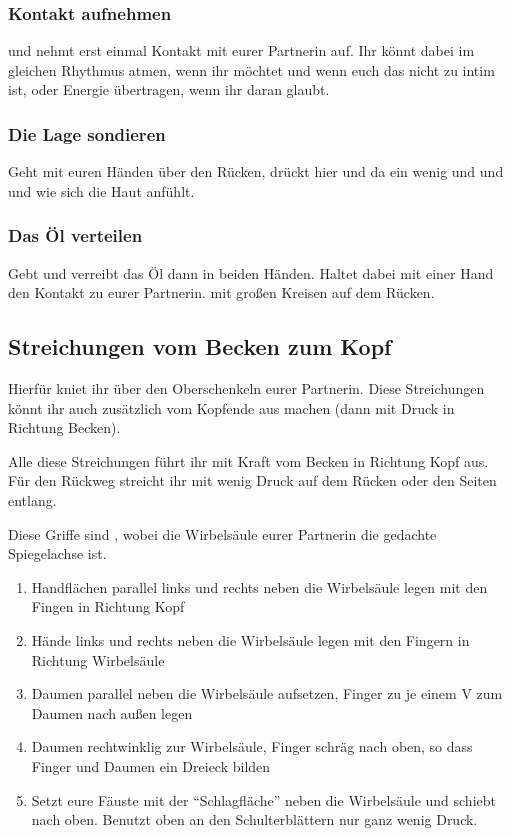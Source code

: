 \subsubsection{Kontakt aufnehmen}
 und nehmt erst einmal Kontakt mit eurer Partnerin auf. Ihr könnt dabei im gleichen Rhythmus atmen, wenn ihr möchtet und wenn euch das nicht zu intim ist, oder Energie übertragen, wenn ihr daran glaubt.

\subsubsection{Die Lage sondieren}
Geht mit euren Händen über den Rücken, drückt hier und da ein wenig und und  und wie sich die Haut anfühlt.

\subsubsection{Das Öl verteilen}

Gebt  und verreibt das Öl dann in beiden Händen. Haltet dabei mit einer Hand den Kontakt zu eurer Partnerin.  mit großen Kreisen auf dem Rücken.


\subsection{Streichungen vom Becken zum Kopf}
Hierfür kniet ihr über den Oberschenkeln eurer Partnerin. Diese Streichungen könnt ihr auch zusätzlich vom Kopfende aus machen (dann mit Druck in Richtung Becken).

Alle diese Streichungen führt ihr mit Kraft vom Becken in Richtung Kopf aus. Für den Rückweg streicht ihr mit wenig Druck auf dem Rücken oder den Seiten entlang.

Diese Griffe sind , wobei die Wirbelsäule eurer Partnerin die gedachte Spiegelachse ist.

\begin{enumerate}
	\item {} Handflächen parallel links und rechts neben die Wirbelsäule legen mit den Fingen in Richtung Kopf
	\item {} Hände links und rechts neben die Wirbelsäule legen mit den Fingern in Richtung Wirbelsäule
	\item {} Daumen parallel neben die Wirbelsäule aufsetzen, Finger zu je einem V zum Daumen nach außen legen
	\item {} Daumen rechtwinklig zur Wirbelsäule, Finger schräg nach oben, so dass Finger und Daumen ein Dreieck bilden
	\item {} Setzt eure Fäuste mit der ``Schlagfläche'' neben die Wirbelsäule und schiebt nach oben. Benutzt oben an den Schulterblättern nur ganz wenig Druck.
\end{enumerate}


